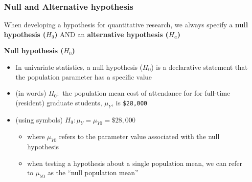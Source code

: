 \documentclass[
  letterpaper,
  DIV=11,
  numbers=noendperiod]{scrartcl}
\newenvironment{Shaded}{\begin{snugshade}}{\end{snugshade}}
\newcommand{\AttributeTok}[1]{\textcolor[rgb]{0.40,0.45,0.13}{#1}}
\newcommand{\CommentTok}[1]{\textcolor[rgb]{0.37,0.37,0.37}{#1}}
\newcommand{\ConstantTok}[1]{\textcolor[rgb]{0.56,0.35,0.01}{#1}}
\newcommand{\FunctionTok}[1]{\textcolor[rgb]{0.28,0.35,0.67}{#1}}
\newcommand{\NormalTok}[1]{\textcolor[rgb]{0.00,0.23,0.31}{#1}}
\newcommand{\SpecialCharTok}[1]{\textcolor[rgb]{0.37,0.37,0.37}{#1}}
\providecommand{\tightlist}{%
  \setlength{\itemsep}{0pt}\setlength{\parskip}{0pt}}\usepackage{longtable,booktabs,array}
\begin{document}
\begin{Shaded}
\end{Shaded}

\subsubsection{Null and Alternative
hypothesis}\label{null-and-alternative-hypothesis}

When developing a hypothesis for quantitative research, we always
specify a \textbf{null hypothesis (\(H_0\))} AND an \textbf{alternative
hypothesis (\(H_a\))}

\textbf{Null hypothesis (\(H_0\))}

\begin{itemize}
\tightlist
\item
  In univariate statistics, a null hypothesis (\(H_0\)) is a declarative
  statement that the population parameter has a specific value
\item
  (in words) \(H_0:\) the population mean cost of attendance for for
  full-time (resident) graduate students, \(\mu_Y\), is
  \texttt{\$28,000}
\item
  (using symbols) \(H_0:\mu_Y = \mu_{Y0} = \$28,000\)

  \begin{itemize}
  \tightlist
  \item
    where \(\mu_{Y0}\) refers to the parameter value associated with the
    null hypothesis
  \item
    when testing a hypothesis about a single population mean, we can
    refer to \(\mu_{Y0}\) as the ``null population mean''
  \end{itemize}
\end{itemize}
\end{document}
